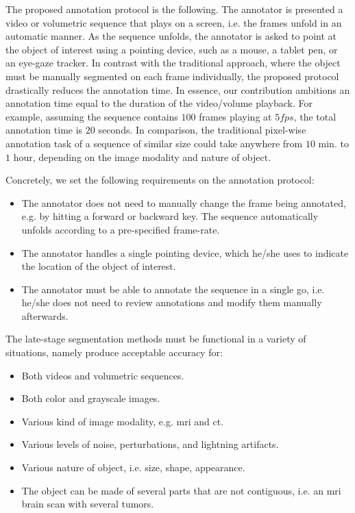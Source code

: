 The proposed annotation protocol is the following.
The annotator is presented a video or volumetric sequence that plays on a screen, i.e. the frames unfold in an automatic manner.
As the sequence unfolds, the annotator is asked to point at the object of interest using a pointing device, such as a mouse, a tablet pen, or an eye-gaze tracker.
In contrast with the traditional approach, where the object must be manually segmented on each frame individually, the proposed protocol drastically reduces the annotation time.
In essence, our contribution ambitions an annotation time equal to the duration of the video/volume playback.
For example, assuming the sequence contains $100$ frames playing at $5fps$, the total annotation time is $20$ seconds.
In comparison, the traditional pixel-wise annotation task of a sequence of similar size could take anywhere from $10$ min. to $1$ hour, depending on the image modality and nature of object.

Concretely, we set the following requirements on the annotation protocol:
\begin{itemize}
  \item The annotator does not need to manually change the frame being annotated, e.g. by hitting a forward or backward key. The sequence automatically unfolds according to a pre-specified frame-rate.
  \item The annotator handles a single pointing device, which he/she uses to indicate the location of the object of interest.
  \item The annotator must be able to annotate the sequence in a single go, i.e. he/she does not need to review annotations and modify them manually afterwards.
\end{itemize}

The late-stage segmentation methods must be functional in a variety of situations, namely produce acceptable accuracy for:
\begin{itemize}
  \item Both videos and volumetric sequences.
  \item Both color and grayscale images.
  \item Various kind of image modality, e.g. \gls{mri} and \gls{ct}.
  \item Various levels of noise, perturbations, and lightning artifacts.
  \item Various nature of object, i.e. size, shape, appearance.
  \item The object can be made of several parts that are not contiguous, i.e. an \gls{mri} brain scan with several tumors.
\end{itemize}


